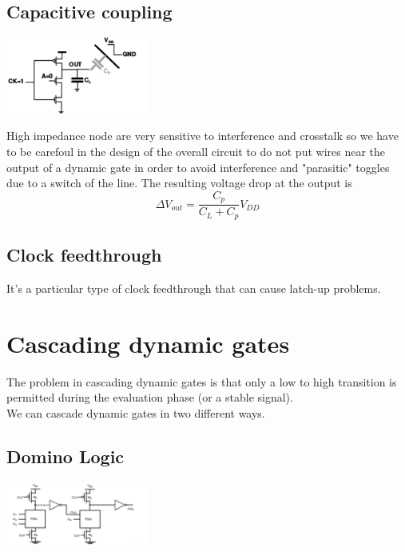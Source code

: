 \subsection{Capacitive coupling}

\centering
\includegraphics[width=0.35\textwidth]{C9_6.png}\\
\raggedright

High impedance node are very sensitive to interference and crosstalk so we have to be carefoul in the design of the overall circuit to do not put wires near the output of a dynamic gate in order to avoid interference and "parasitic" toggles due to a switch of the line.
The resulting voltage drop at the output is 
\begin{equation}
\Delta V_{out}=\frac{C_p}{C_L+C_p}V_{DD}
\end{equation}

\subsection{Clock feedthrough}
It's a particular type of clock feedthrough that can cause latch-up problems.\\


\section{Cascading dynamic gates}
The problem in cascading dynamic gates is that only a low to high transition is permitted during the evaluation phase (or a stable signal).\\
We can cascade dynamic gates in two different ways.

\subsection{Domino Logic}

\centering
\includegraphics[width=0.35\textwidth]{C9_7.png}\\
\raggedright

